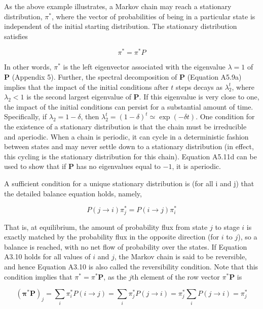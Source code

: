 \documentclass{article}
\begin{document}
As the above example illustrates, a Markov chain may reach a stationary distribution,  $ \pi^{*} $, where the vector of probabilities of being in a particular state is independent of the initial starting distribution. The stationary distribution satisfies

\begin{equation}
\pi^{*}=\pi^{*}P
\end{equation}

In other words,  $ \pi^* $ is the left eigenvector associated with the eigenvalue  $ \lambda = 1 $ of  $ \mathbf{P} $ (Appendix 5). Further, the spectral decomposition of  $ \mathbf{P} $ (Equation A5.9a) implies that the impact of the initial conditions after  $ t $ steps decays as  $ \lambda_2^t $, where  $ \lambda_2 < 1 $ is the second largest eigenvalue of  $ \mathbf{P} $. If this eigenvalue is very close to one, the impact of the initial conditions can persist for a substantial amount of time. Specifically, if  $ \lambda_2 = 1 - \delta $, then  $ \lambda_2^t = (1 - \delta)^t \simeq \exp(-\delta t) $. One condition for the existence of a stationary distribution is that the chain must be irreducible and aperiodic. When a chain is periodic, it can cycle in a deterministic fashion between states and may never settle down to a stationary distribution (in effect, this cycling is the stationary distribution for this chain). Equation A5.11d can be used to show that if  $ \mathbf{P} $ has no eigenvalues equal to  $ -1 $, it is aperiodic.

A sufficient condition for a unique stationary distribution is (for all i and j) that the detailed balance equation holds, namely,

\begin{equation}
P(j\rightarrow i)\pi_{j}^{*}=P(i\rightarrow j)\pi_{i}^{*}
\end{equation}

That is, at equilibrium, the amount of probability flux from state $j$ to stage $i$ is exactly matched by the probability flux in the opposite direction (for $i$ to $j$), so a balance is reached, with no net flow of probability over the states. If Equation A3.10 holds for all values of $i$ and $j$, the Markov chain is said to be reversible, and hence Equation A3.10 is also called the reversibility condition. Note that this condition implies that $\pi^* = \pi^* \mathbf{P}$, as the $j$th element of the row vector $\pi^* \mathbf{P}$ is

\begin{equation}
(\boldsymbol{\pi}^{*}\mathbf{P})_{j}=\sum_{i}\pi_{i}^{*}P(i\rightarrow j)=\sum_{i}\pi_{j}^{*}P(j\rightarrow i)=\pi_{j}^{*}\sum_{i}P(j\rightarrow i)=\pi_{j}^{*}
\end{equation}
\end{document}
